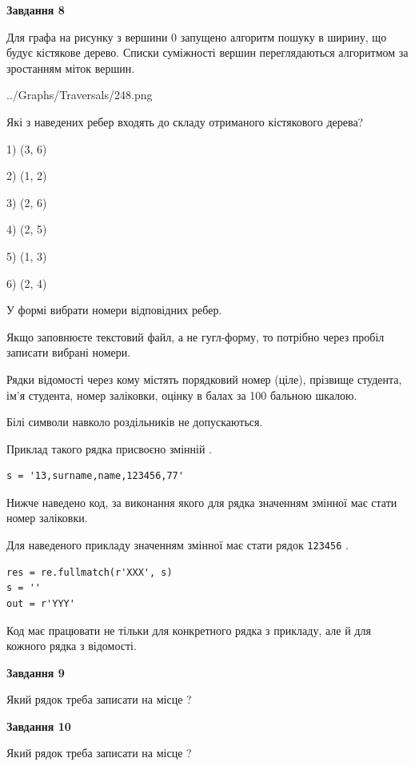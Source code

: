 \documentclass[12pt, ukrainian]{article}
\def\code#1{\Verb!#1!}
\begin{document}
{\begin {large}
{\begin {center}\textbf{Завдання 8}\end {center}}\par
Для графа на рисунку з вершини 0 запущено алгоритм пошуку в ширину, що будує кістякове дерево. Списки суміжності вершин переглядаються алгоритмом за зростанням міток вершин.\par
\begin{center}
	{../Graphs/Traversals/248.png}
\end{center}
\par Які з наведених ребер входять до складу отриманого кістякового дерева?\par
1) (3, 6)\par
2) (1, 2)\par
3) (2, 6)\par
4) (2, 5)\par
5) (1, 3)\par
6) (2, 4)\par
{\vskip 15pt} У формі вибрати номери відповідних ребер.


Якщо заповнюєте текстовий файл, а не гугл-форму, то потрібно через пробіл записа\-ти вибрані номери.\par
\newpage


Рядки відомості через кому містять порядковий номер (ціле), пріз\-ви\-ще студен\-та, ім'я студента, номер заліковки, оцінку в балах за 100 бальною шкалою.

Білі символи навколо роздільників не допускаються.

Приклад такого рядка присвоєно змінній .



\begin{verbatim}
s = '13,surname,name,123456,77'
\end{verbatim}


Нижче наведено код, за виконання якого для рядка  значенням змінної  має стати номер заліковки.

Для наведеного прикладу значенням змінної  має стати рядок \code{123456} .



\begin{verbatim}
res = re.fullmatch(r'XXX', s)
s = ''
out = r'YYY'
\end{verbatim}


Код має працювати не тільки для конкретного рядка з прикладу, але й для кожного рядка з відомості.

{\begin {center}\textbf{Завдання 9}\end {center}}\par
Який рядок треба записати на місце  ?\par
\vspace{5mm}


{\begin {center}\textbf{Завдання 10}\end {center}}\par
Який рядок треба записати на місце  ?\par


\newpage


\end {large}}
\end{document}
